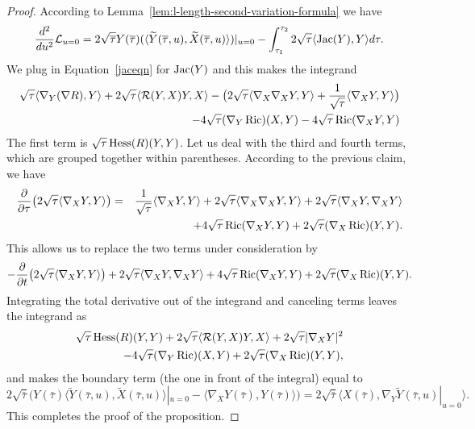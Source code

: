 \begin{proof}
\sketch
{}
According to Lemma~\ref{lem:l-length-second-variation-formula} we have
$$\frac{d^2}{du^2}{\mathcal L}_{u=0}=2\sqrt{\overline
\tau}Y(\overline\tau)(\langle \widetilde Y(\overline\tau,u),\widetilde
X(\overline\tau,u)\rangle)|_{u=0}-\int_{\tau_1}^{\tau_2}2\sqrt{\tau}\langle
\operatorname{Jac}(Y),Y\rangle d\tau.$$ We plug in
Equation~\ref{jaceqn} for $\operatorname{Jac}(Y)$ and this makes the
integrand
\begin{eqnarray*}\sqrt{\tau}\langle\nabla_Y(\nabla
R),Y\rangle+2\sqrt{\tau}\langle{\mathcal R}(Y,X)Y,X\rangle
-\bigl(2\sqrt{\tau}\langle\nabla_X\nabla_XY,Y\rangle+\frac{1}{\sqrt{\tau}}\langle\nabla_XY,Y\rangle\bigr)\\
-4\sqrt{\tau}(\nabla_Y\operatorname{Ric})(X,Y)-4\sqrt{\tau}\operatorname{Ric}(\nabla_XY,Y)
\end{eqnarray*}
The first term is $\sqrt{\tau}\operatorname{Hess}(R)(Y,Y)$. Let us deal with
the third and fourth terms, which are grouped together within
parentheses. According to the previous claim, we have
\begin{eqnarray*}
\frac{\partial}{\partial \tau}\bigl(2\sqrt{\tau}\langle
\nabla_XY,Y\rangle\bigr) & = &
\frac{1}{\sqrt{\tau}}\langle\nabla_XY,Y\rangle+2\sqrt{\tau}\langle\nabla_X\nabla_XY,Y\rangle
 +2\sqrt{\tau}\langle\nabla_XY,\nabla_XY\rangle \\ & & +4\sqrt{\tau}\operatorname{Ric}(\nabla_XY,Y)
 +2\sqrt{\tau} (\nabla_X\operatorname{Ric})(Y,Y).
\end{eqnarray*}
This allows us to replace the two terms under consideration by
$$-\frac{\partial}{\partial t}\bigl(2\sqrt{\tau}\langle
\nabla_XY,Y\rangle\bigr)+2\sqrt{\tau}\langle\nabla_XY,\nabla_XY\rangle+4\sqrt{\tau}\operatorname{Ric}(\nabla_XY,Y) +2\sqrt{\tau} (\nabla_X\operatorname{Ric})(Y,Y).$$
Integrating the total derivative out of the integrand  and canceling
terms leaves the integrand as
\begin{eqnarray*}\sqrt{\tau}\operatorname{Hess}(R)(Y,Y)+2\sqrt{\tau}\langle{\mathcal R}(Y,X)Y,X\rangle
+2\sqrt{\tau}|\nabla_XY|^2 \\
-4\sqrt{\tau}(\nabla_Y\operatorname{Ric})(X,Y)+2\sqrt{\tau} (\nabla_X\operatorname{Ric})(Y,Y),
\end{eqnarray*}
and makes the boundary term (the one in front of the integral) equal
to
$$2\sqrt{\bar\tau}\bigl(Y(\bar\tau)\langle
\widetilde Y(\bar\tau,u),\widetilde
X(\bar\tau,u)\rangle|_{u=0}-\langle
\nabla_XY(\bar\tau),Y(\bar\tau)\rangle\bigr)=2\sqrt{\bar\tau}\langle
X(\bar\tau),\nabla_Y\widetilde Y(\bar\tau,u)|_{u=0}\rangle.$$ This
completes the proof of the proposition.
\end{proof}








